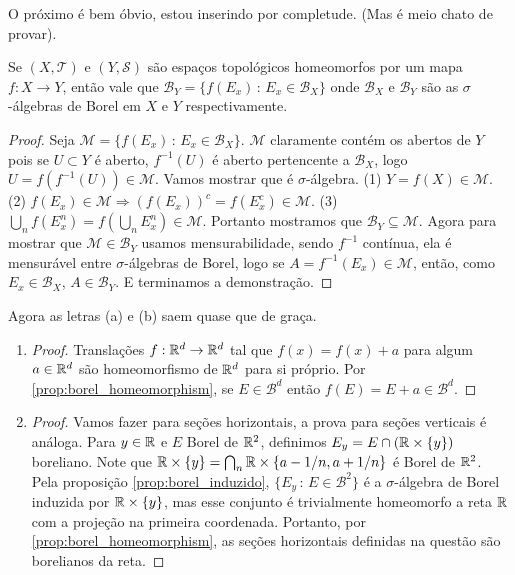     O próximo é bem óbvio, estou inserindo por completude. (Mas é meio chato de provar).
\begin{prop} \label{prop:borel_homeomorphism}
    Se $(X,\mathcal{T})$ e $(Y,\mathcal{S})$ são espaços topológicos homeomorfos por um mapa $f:X \to Y$, então vale que $\mathcal{B}_Y = \{f(E_x) \, : \, E_x \in \mathcal{B}_X\}$ 
    onde $\mathcal{B}_X$ e $\mathcal{B}_Y$ são as $\sigma$-álgebras de Borel em $X$ e $Y$ respectivamente. 
\end{prop}

\begin{proof}
    Seja $\mathcal{M} = \{f(E_x) \, : \, E_x \in \mathcal{B}_X\}$. $\mathcal{M}$ claramente contém
    os abertos de $Y$ pois se $U \subset Y$ é aberto, $f^{-1}(U)$ é aberto pertencente a $\mathcal{B}_X$, logo $U = f(f^{-1}(U)) \in \mathcal{M}$. Vamos mostrar que é $\sigma$-álgebra.
    (1) $Y = f(X) \in \mathcal{M}$. (2) $f(E_x) \in \mathcal{M} \Rightarrow (f(E_x))^c = f(E_x^c) \in \mathcal{M}$. (3) $\bigcup_n f(E_x^n) = f(\bigcup_n E_x^n) \in \mathcal{M}$. Portanto mostramos que $\mathcal{B}_Y \subseteq \mathcal{M}$. Agora para mostrar que $\mathcal{M} \in \mathcal{B}_Y$ usamos mensurabilidade, sendo $f^{-1}$ contínua, ela é mensurável entre $\sigma$-álgebras de Borel, logo se $A = f^{-1}(E_x) \in \mathcal{M}$, então, como $E_x \in \mathcal{B}_X$, $A \in \mathcal{B}_Y$. E terminamos a demonstração. 
\end{proof}
Agora as letras (a) e (b) saem quase que de graça.
\begin{enumerate}[label=(\alph*)]
    \item \begin{proof}
        Translações $f:\mathbb{R}^d \rightarrow \mathbb{R}^d$ tal que $f(x) = f(x) + a$ para algum $a \in \mathbb{R}^d$ são homeomorfismo de $\mathbb{R}^d$ para si próprio. Por \ref{prop:borel_homeomorphism}, se $E \in \mathcal{B}^d$ então $f(E) = E + a \in \mathcal{B}^d$.
    \end{proof}
    \item \begin{proof}
        Vamos fazer para seções horizontais, a prova para seções verticais é análoga.
        Para $y \in \mathbb{R}$ e $E$ Borel de $\mathbb{R}^2$, definimos $E_y = E \cap (\mathbb{R} \times \{y\})$ boreliano. Note que 
        $\mathbb{R} \times \{y\} = \bigcap_n \mathbb{R} \times \{a - 1/n, a + 1/n\}$ é Borel de $\mathbb{R}^2$. Pela proposição
        \ref{prop:borel_induzido}, $\{E_y \, : \, E \in \mathcal{B}^2\}$ é a $\sigma$-álgebra de Borel induzida por $\mathbb{R} \times \{y\}$, mas esse conjunto é trivialmente homeomorfo a reta $\mathbb{R}$ com 
        a projeção na primeira coordenada. Portanto, por \ref{prop:borel_homeomorphism}, as seções horizontais definidas na questão são borelianos da reta.
    \end{proof}
\end{enumerate}




